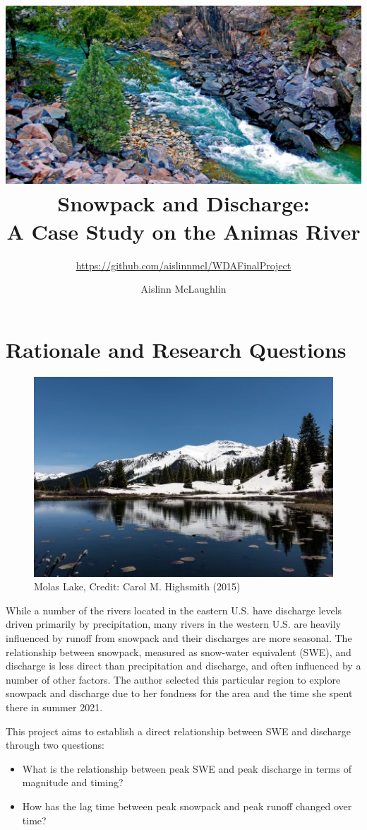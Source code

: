 \documentclass[
  12pt,
]{article}
\title{\includegraphics{animas_river.jpg}\\
Snowpack and Discharge:\\
A Case Study on the Animas River}
\subtitle{\url{https://github.com/aislinnmcl/WDAFinalProject}}
\author{Aislinn McLaughlin}
\date{}
\begin{document}
\maketitle

\newpage

\hypertarget{rationale-and-research-questions}{%
\section{Rationale and Research
Questions}\label{rationale-and-research-questions}}

\begin{figure}
\centering
\includegraphics{molas_lake.jpg}
\caption{Molas Lake, Credit: Carol M. Highsmith (2015)}
\end{figure}

While a number of the rivers located in the eastern U.S. have discharge
levels driven primarily by precipitation, many rivers in the western
U.S. are heavily influenced by runoff from snowpack and their discharges
are more seasonal. The relationship between snowpack, measured as
snow-water equivalent (SWE), and discharge is less direct than
precipitation and discharge, and often influenced by a number of other
factors. The author selected this particular region to explore snowpack
and discharge due to her fondness for the area and the time she spent
there in summer 2021.

This project aims to establish a direct relationship between SWE and
discharge through two questions:

\begin{itemize}
\item
  What is the relationship between peak SWE and peak discharge in terms
  of magnitude and timing?
\item
  How has the lag time between peak snowpack and peak runoff changed
  over time?
\end{itemize}
\end{document}
